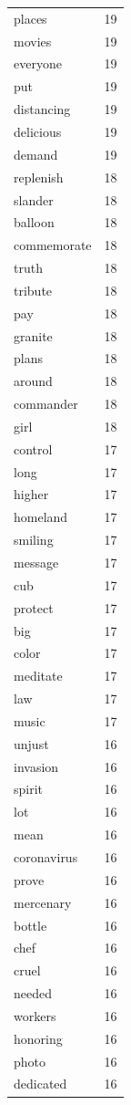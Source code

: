 \begin{tabular}{lr}
places & 19 \\
movies & 19 \\
everyone & 19 \\
put & 19 \\
distancing & 19 \\
delicious & 19 \\
demand & 19 \\
replenish & 18 \\
slander & 18 \\
balloon & 18 \\
commemorate & 18 \\
truth & 18 \\
tribute & 18 \\
pay & 18 \\
granite & 18 \\
plans & 18 \\
around & 18 \\
commander & 18 \\
girl & 18 \\
control & 17 \\
long & 17 \\
higher & 17 \\
homeland & 17 \\
smiling & 17 \\
message & 17 \\
cub & 17 \\
protect & 17 \\
big & 17 \\
color & 17 \\
meditate & 17 \\
law & 17 \\
music & 17 \\
unjust & 16 \\
invasion & 16 \\
spirit & 16 \\
lot & 16 \\
mean & 16 \\
coronavirus & 16 \\
prove & 16 \\
mercenary & 16 \\
bottle & 16 \\
chef & 16 \\
cruel & 16 \\
needed & 16 \\
workers & 16 \\
honoring & 16 \\
photo & 16 \\
dedicated & 16 \\

\end{tabular}
